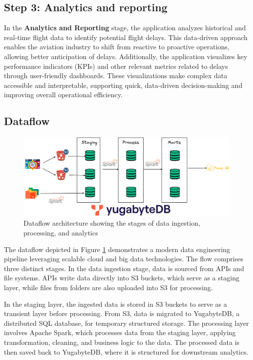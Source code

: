 \documentclass[12pt,a4paper]{article}
\begin{document}
\subsection*{Step 3: Analytics and reporting}
In the \textbf{Analytics and Reporting} stage, the application analyzes
historical and real-time flight data to identify potential flight delays. This
data-driven approach enables the aviation industry to shift from reactive to
proactive operations, allowing better anticipation of delays. Additionally, the
application visualizes key performance indicators (KPIs) and other relevant
metrics related to delays through user-friendly dashboards. These visualizations
make complex data accessible and interpretable, supporting quick, data-driven
decision-making and improving overall operational efficiency.

\subsection{Dataflow}

\begin{figure}[h]
\centering
\includegraphics[width=\textwidth]{Images/dataflow.png}
\vspace{1em}
\caption{Dataflow architecture showing the stages of data ingestion, processing, and analytics}
\label{fig:dataflow}
\end{figure}

The dataflow depicted in Figure \ref{fig:dataflow} demonstrates a modern data
engineering pipeline leveraging scalable cloud and big data technologies. The
flow comprises three distinct stages. In the data ingestion stage, data is
sourced from APIs and file systems. APIs write data directly into S3 buckets,
which serve as a staging layer, while files from folders are also uploaded into
S3 for processing.

In the staging layer, the ingested data is stored in S3 buckets to serve as a
transient layer before processing. From S3, data is migrated to YugabyteDB, a
distributed SQL database, for temporary structured storage. The processing layer
involves Apache Spark, which processes data from the staging layer, applying
transformation, cleaning, and business logic to the data. The processed data is
then saved back to YugabyteDB, where it is structured for downstream analytics.
\end{document}
